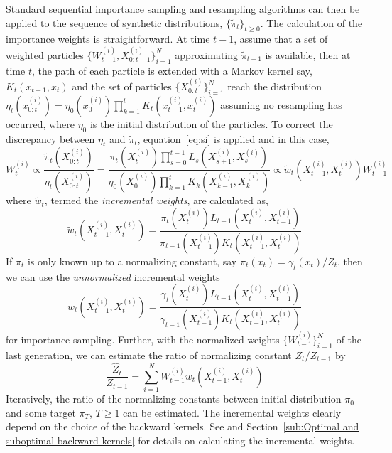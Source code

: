 Standard sequential importance sampling and resampling algorithms can then be
applied to the sequence of synthetic distributions, $\{\tilde\pi_t\}_{t\ge0}$.
The calculation of the importance weights is straightforward. At time $t-1$,
assume that a set of weighted particles
$\{W_{t-1}^{(i)},X_{0:t-1}^{(i)}\}_{i=1}^N$ approximating $\tilde\pi_{t-1}$ is
available, then at time $t$, the path of each particle is extended with a
Markov kernel say, $K_t(x_{t-1}, x_t)$ and the set of particles
$\{X_{0:t}^{(i)}\}_{i=1}^N$ reach the distribution $\eta_t(x_{0:t}^{(i)}) =
\eta_0(x_0^{(i)})\prod_{k=1}^tK_t(x_{t-1}^{(i)}, x_t^{(i)})$ assuming no
resampling has occurred, where $\eta_0$ is the initial distribution of the
particles. To correct the discrepancy between $\eta_t$ and $\tilde\pi_t$,
equation~\eqref{eq:si} is applied and in this case,
\begin{equation}
  W_t^{(i)} \propto \frac{\tilde\pi_t(X_{0:t}^{(i)})}{\eta_t(X_{0:t}^{(i)})}
  = \frac{\pi_t(X_t^{(i)})\prod_{s=0}^{t-1}L_s(X_{s+1}^{(i)}, X_s^{(i)})}
  {\eta_0(X_0^{(i)})\prod_{k=1}^tK_k(X_{k-1}^{(i)},X_k^{(i)})}
  \propto \tilde{w}_t(X_{t-1}^{(i)}, X_t^{(i)})W_{t-1}^{(i)}
\end{equation}
where $\tilde{w}_t$, termed the \emph{incremental weights}, are calculated as,
\begin{equation}
  \tilde{w}_t(X_{t-1}^{(i)},X_t^{(i)}) =
  \frac{\pi_t(X_t^{(i)})L_{t-1}(X_t^{(i)}, X_{t-1}^{(i)})}
  {\pi_{t-1}(X_{t-1}^{(i)})K_t(X_{t-1}^{(i)}, X_t^{(i)})}
\end{equation}
If $\pi_t$ is only known up to a normalizing constant, say $\pi_t(x_t) =
\gamma_t(x_t)/Z_t$, then we can use the \emph{unnormalized} incremental
weights
\begin{equation}
  w_t(X_{t-1}^{(i)},X_t^{(i)}) =
  \frac{\gamma_t(X_t^{(i)})L_{t-1}(X_t^{(i)}, X_{t-1}^{(i)})}
  {\gamma_{t-1}(X_{t-1}^{(i)})K_t(X_{t-1}^{(i)}, X_t^{(i)})}
\end{equation}
for importance sampling. Further, with the normalized weights
$\{W_{t-1}^{(i)}\}_{i=1}^N$ of the last generation, we can estimate the ratio
of normalizing constant $Z_t/Z_{t-1}$ by
\begin{equation}
  \frac{\hat{Z}_t}{Z_{t-1}} =
  \sum_{i=1}^N W_{t-1}^{(i)}w_t(X_{t-1}^{(i)},X_t^{(i)})
  \label{eq:ratio normalized}
\end{equation}
Iteratively, the ratio of the normalizing constants between initial
distribution $\pi_0$ and some target $\pi_T$, $T\ge1$ can be estimated. The
incremental weights clearly depend on the choice of the backward kernels. See
\cite{DelMoral:2006hc} and Section~\ref{sub:Optimal and suboptimal backward
  kernels} for details on calculating the incremental weights.

